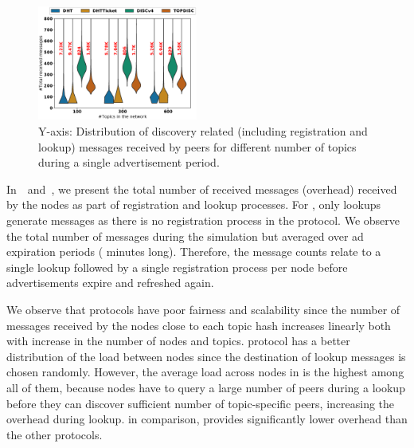 \begin{figure}
\centering
\includegraphics[width=0.470\textwidth]{results/no_split/violin_topic_totalMsg.eps}
\caption{Y-axis: Distribution of discovery related (including registration and lookup) messages received by peers for different number of topics during a single advertisement period.}
\label{fig:msgsPerTopic}
\end{figure}

In~~and~, we present the total number of received messages (\ie overhead) received by the nodes as part of registration and lookup processes. For \discv, only lookups generate messages as there is no registration process in the protocol.
We observe the total number of messages during the simulation but averaged over ad expiration periods ( minutes long). Therefore, the message counts relate to a single lookup followed by a single registration process per node before advertisements expire and refreshed again.

We observe that \altname protocols have poor fairness and scalability since the number of messages received by the nodes close to each topic hash increases linearly both with increase in the number of nodes and topics. 
\discv protocol has a better distribution of the load between nodes since the destination of lookup messages is chosen randomly. However, the average load across nodes in \discv is the highest among all of them, because nodes have to query a large number of peers during a lookup before they can discover sufficient number of topic-specific peers, increasing the overhead during lookup.
\sysname in comparison, provides significantly lower overhead than the other protocols. 


